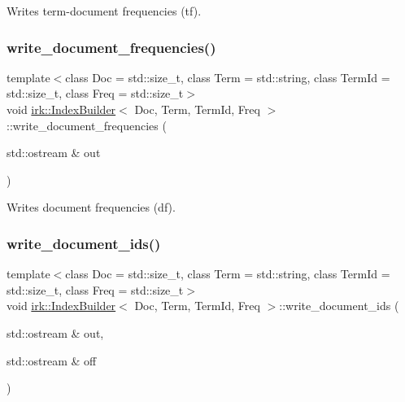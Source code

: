 Writes term-\/document frequencies (tf). 

\mbox{\label{classirk_1_1IndexBuilder_ac14f0ccfa788209fe382c2217e61d35e}} 
\subsubsection{\texorpdfstring{write\+\_\+document\+\_\+frequencies()}{write\_document\_frequencies()}}
{\footnotesize\ttfamily template$<$class Doc  = std\+::size\+\_\+t, class Term  = std\+::string, class Term\+Id  = std\+::size\+\_\+t, class Freq  = std\+::size\+\_\+t$>$ \\
void \mbox{\hyperlink{classirk_1_1IndexBuilder}{irk\+::\+Index\+Builder}}$<$ Doc, Term, Term\+Id, Freq $>$\+::write\+\_\+document\+\_\+frequencies (\begin{DoxyParamCaption}\item[{std\+::ostream \&}]{out }\end{DoxyParamCaption})\hspace{0.3cm}{\ttfamily [inline]}}



Writes document frequencies (df). 

\mbox{\label{classirk_1_1IndexBuilder_a3b9ed7fa070080f130c7f2a0028f472a}} 
\subsubsection{\texorpdfstring{write\+\_\+document\+\_\+ids()}{write\_document\_ids()}}
{\footnotesize\ttfamily template$<$class Doc  = std\+::size\+\_\+t, class Term  = std\+::string, class Term\+Id  = std\+::size\+\_\+t, class Freq  = std\+::size\+\_\+t$>$ \\
void \mbox{\hyperlink{classirk_1_1IndexBuilder}{irk\+::\+Index\+Builder}}$<$ Doc, Term, Term\+Id, Freq $>$\+::write\+\_\+document\+\_\+ids (\begin{DoxyParamCaption}\item[{std\+::ostream \&}]{out,  }\item[{std\+::ostream \&}]{off }\end{DoxyParamCaption})\hspace{0.3cm}{\ttfamily [inline]}}



